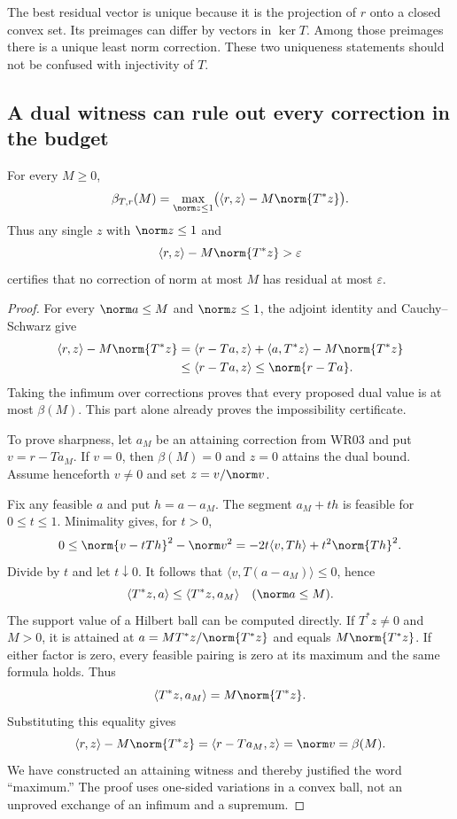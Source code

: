 The best residual vector is unique because it is the projection of $r$ onto a closed convex set. Its preimages can differ by vectors in $\ker T$. Among those preimages there is a unique least norm correction. These two uniqueness statements should not be confused with injectivity of $T$.

\subsection{A dual witness can rule out every correction in the budget}
\begin{theorem}\label{WR04}
For every $M\ge0$,
\begin{equation}\label{eq:budget-dual}
 \beta_{T,r}(M)=
 \max_{\norm z\le1}\bigl(\langle r,z\rangle-M\norm{T^*z}\bigr).
\end{equation}
Thus any single $z$ with $\norm z\le1$ and
\[
 \langle r,z\rangle-M\norm{T^*z}>\varepsilon
\]
certifies that no correction of norm at most $M$ has residual at most $\varepsilon$.
\end{theorem}
\begin{proof}
For every $\norm a\le M$ and $\norm z\le1$, the adjoint identity and Cauchy--Schwarz give
\[
\begin{aligned}
 \langle r,z\rangle-M\norm{T^*z}
 &=\langle r-Ta,z\rangle+\langle a,T^*z\rangle-M\norm{T^*z}\\
 &\le\langle r-Ta,z\rangle
 \le\norm{r-Ta}.
\end{aligned}
\]
Taking the infimum over corrections proves that every proposed dual value is at most $\beta(M)$. This part alone already proves the impossibility certificate.

To prove sharpness, let $a_M$ be an attaining correction from WR03 and put $v=r-Ta_M$. If $v=0$, then $\beta(M)=0$ and $z=0$ attains the dual bound. Assume henceforth $v\ne0$ and set $z=v/\norm v$.

Fix any feasible $a$ and put $h=a-a_M$. The segment $a_M+th$ is feasible for $0\le t\le1$. Minimality gives, for $t>0$,
\[
 0\le\norm{v-tTh}^2-\norm v^2
   =-2t\langle v,Th\rangle+t^2\norm{Th}^2.
\]
Divide by $t$ and let $t\downarrow0$. It follows that $\langle v,T(a-a_M)\rangle\le0$, hence
\[
 \langle T^*z,a\rangle\le\langle T^*z,a_M\rangle
 \quad(\norm a\le M).
\]
The support value of a Hilbert ball can be computed directly. If $T^*z\ne0$ and $M>0$, it is attained at $a=M T^*z/\norm{T^*z}$ and equals $M\norm{T^*z}$. If either factor is zero, every feasible pairing is zero at its maximum and the same formula holds. Thus
\[
 \langle T^*z,a_M\rangle=M\norm{T^*z}.
\]
Substituting this equality gives
\[
 \langle r,z\rangle-M\norm{T^*z}
 =\langle r-Ta_M,z\rangle=\norm v=\beta(M).
\]
We have constructed an attaining witness and thereby justified the word ``maximum.'' The proof uses one-sided variations in a convex ball, not an unproved exchange of an infimum and a supremum.
\end{proof}

